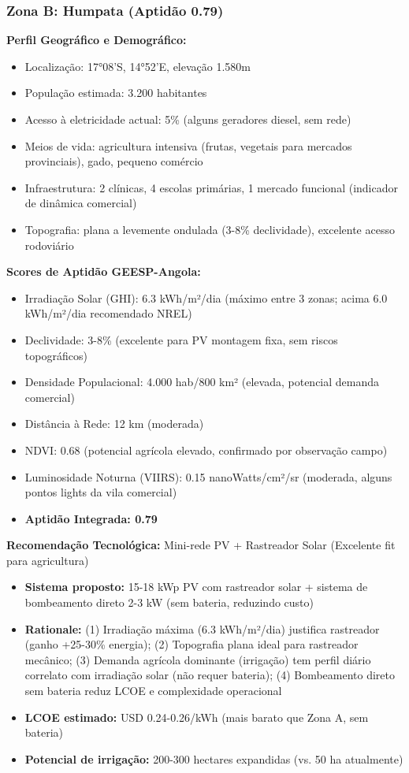 \documentclass[12pt, a4paper]{article}
\begin{document}
\subsubsection{Zona B: Humpata (Aptidão 0.79)}

\textbf{Perfil Geográfico e Demográfico:}
\begin{itemize}
\item Localização: 17°08'S, 14°52'E, elevação 1.580m
\item População estimada: 3.200 habitantes
\item Acesso à eletricidade actual: 5\% (alguns geradores diesel, sem rede)
\item Meios de vida: agricultura intensiva (frutas, vegetais para mercados provinciais), gado, pequeno comércio
\item Infraestrutura: 2 clínicas, 4 escolas primárias, 1 mercado funcional (indicador de dinâmica comercial)
\item Topografia: plana a levemente ondulada (3-8\% declividade), excelente acesso rodoviário
\end{itemize}

\textbf{Scores de Aptidão GEESP-Angola:}
\begin{itemize}
\item Irradiação Solar (GHI): 6.3 kWh/m²/dia (máximo entre 3 zonas; acima 6.0 kWh/m²/dia recomendado NREL)
\item Declividade: 3-8\% (excelente para PV montagem fixa, sem riscos topográficos)
\item Densidade Populacional: 4.000 hab/800 km² (elevada, potencial demanda comercial)
\item Distância à Rede: 12 km (moderada)
\item NDVI: 0.68 (potencial agrícola elevado, confirmado por observação campo)
\item Luminosidade Noturna (VIIRS): 0.15 nanoWatts/cm²/sr (moderada, alguns pontos lights da vila comercial)
\item \textbf{Aptidão Integrada: 0.79}
\end{itemize}

\textbf{Recomendação Tecnológica:}
Mini-rede PV + Rastreador Solar (Excelente fit para agricultura)
\begin{itemize}
\item \textbf{Sistema proposto:} 15-18 kWp PV com rastreador solar + sistema de bombeamento direto 2-3 kW (sem bateria, reduzindo custo)
\item \textbf{Rationale:} (1) Irradiação máxima (6.3 kWh/m²/dia) justifica rastreador (ganho +25-30\% energia); (2) Topografia plana ideal para rastreador mecânico; (3) Demanda agrícola dominante (irrigação) tem perfil diário correlato com irradiação solar (não requer bateria); (4) Bombeamento direto sem bateria reduz LCOE e complexidade operacional
\item \textbf{LCOE estimado:} USD 0.24-0.26/kWh (mais barato que Zona A, sem bateria)
\item \textbf{Potencial de irrigação:} 200-300 hectares expandidas (vs. 50 ha atualmente)
\end{itemize}
\end{document}
